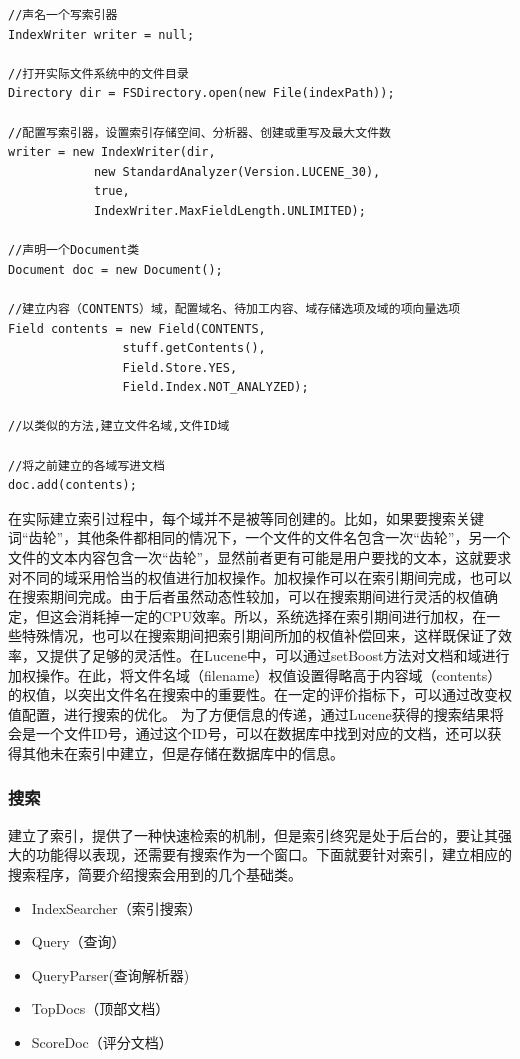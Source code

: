 \documentclass[12pt,a4paper]{article}
\begin{document}
	\lstset{language=Java,frame=lines}
	\begin{lstlisting}
//声名一个写索引器	
IndexWriter writer = null;

//打开实际文件系统中的文件目录
Directory dir = FSDirectory.open(new File(indexPath));

//配置写索引器，设置索引存储空间、分析器、创建或重写及最大文件数
writer = new IndexWriter(dir, 
			new StandardAnalyzer(Version.LUCENE_30), 
			true,
			IndexWriter.MaxFieldLength.UNLIMITED);

//声明一个Document类
Document doc = new Document();

//建立内容（CONTENTS）域，配置域名、待加工内容、域存储选项及域的项向量选项
Field contents = new Field(CONTENTS, 
				stuff.getContents(), 
				Field.Store.YES,
				Field.Index.NOT_ANALYZED);
					 
//以类似的方法,建立文件名域,文件ID域

//将之前建立的各域写进文档
doc.add(contents);
	\end{lstlisting}
	
	在实际建立索引过程中，每个域并不是被等同创建的。比如，如果要搜索关键词“齿轮”，其他条件都相同的情况下，一个文件的文件名包含一次“齿轮”，另一个文件的文本内容包含一次“齿轮”，显然前者更有可能是用户要找的文本，这就要求对不同的域采用恰当的权值进行加权操作。加权操作可以在索引期间完成，也可以在搜索期间完成。由于后者虽然动态性较加，可以在搜索期间进行灵活的权值确定，但这会消耗掉一定的CPU效率。所以，系统选择在索引期间进行加权，在一些特殊情况，也可以在搜索期间把索引期间所加的权值补偿回来，这样既保证了效率，又提供了足够的灵活性。在Lucene中，可以通过setBoost方法对文档和域进行加权操作。在此，将文件名域（filename）权值设置得略高于内容域（contents）的权值，以突出文件名在搜索中的重要性。在一定的评价指标下，可以通过改变权值配置，进行搜索的优化。
	为了方便信息的传递，通过Lucene获得的搜索结果将会是一个文件ID号，通过这个ID号，可以在数据库中找到对应的文档，还可以获得其他未在索引中建立，但是存储在数据库中的信息。
	
		\subsubsection{搜索}
	建立了索引，提供了一种快速检索的机制，但是索引终究是处于后台的，要让其强大的功能得以表现，还需要有搜索作为一个窗口。下面就要针对索引，建立相应的搜索程序，简要介绍搜索会用到的几个基础类。
	
	\begin{itemize}
		\item IndexSearcher（索引搜索）
		\item Query（查询）
		\item QueryParser(查询解析器)
		\item TopDocs（顶部文档）
		\item ScoreDoc（评分文档）
	\end{itemize}
	
\end{document}
